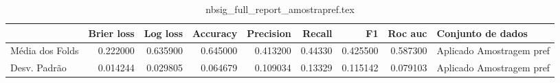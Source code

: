 \begin{table}
\centering
\caption{nbsig_full_report_amostrapref.tex}
\label{nbsig_full_report_amostrapref.tex}
\begin{tabular}{lrrrrrrrl}
\toprule
{} &  Brier  loss &  Log loss &  Accuracy  &  Precision  &  Recall  &       F1  &  Roc auc  &         Conjunto de dados \\
\midrule
Média dos Folds &     0.222000 &  0.635900 &   0.645000 &    0.413200 &  0.44330 &  0.425500 &  0.587300 &  Aplicado Amostragem pref \\
Desv. Padrão    &     0.014244 &  0.029805 &   0.064679 &    0.109034 &  0.13329 &  0.115142 &  0.079103 &  Aplicado Amostragem pref \\
\bottomrule
\end{tabular}
\end{table}
